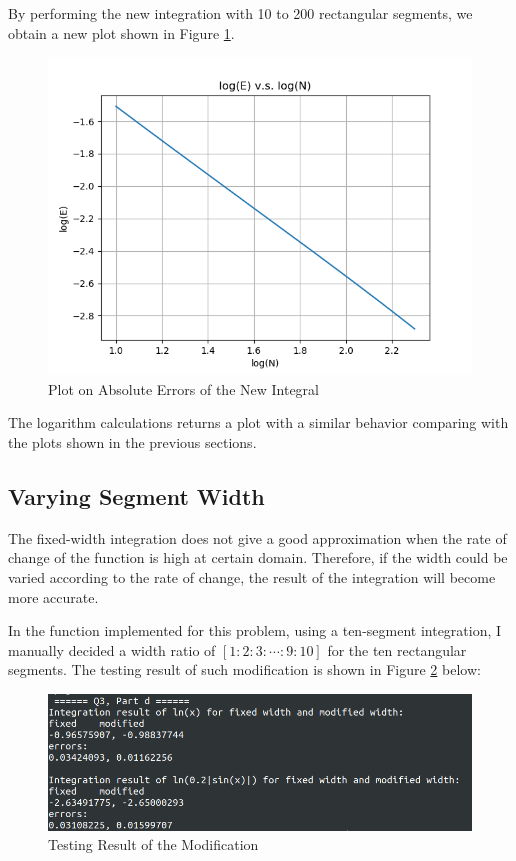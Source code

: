 \documentclass[a4paper,titlepage]{article}
\begin{document}
			By performing the new integration with 10 to 200 rectangular segments, we obtain a new plot shown in Figure \ref{ln_sin_err}.
			\begin{figure}[!h]
				\centering
				\includegraphics[width=\linewidth]{../data/ln_sine_err_int}
				\caption{Plot on Absolute Errors of the New Integral}
				\label{ln_sin_err}
			\end{figure}
		
			The logarithm calculations returns a plot with a similar behavior comparing with the plots shown in the previous sections. 
			
		\subsection{Varying Segment Width}
			The fixed-width integration does not give a good approximation when the rate of change of the function is high at certain domain. Therefore, if the width could be varied according to the rate of change, the result of the integration will become more accurate. 
			
			In the function implemented for this problem, using a ten-segment integration, I manually decided a width ratio of $[1:2:3:\cdots:9:10]$ for the ten rectangular segments. The testing result of such modification is shown in Figure \ref{mod_width} below:
			\begin{figure}[!h]
				\centering
				\includegraphics[width=\linewidth]{width_mod}
				\caption{Testing Result of the Modification}
				\label{mod_width}
			\end{figure}
		
\end{document}
